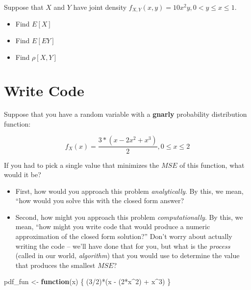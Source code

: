 \documentclass[
]{book}
\newenvironment{Shaded}{\begin{snugshade}}{\end{snugshade}}
\newcommand{\ControlFlowTok}[1]{\textcolor[rgb]{0.13,0.29,0.53}{\textbf{#1}}}
\newcommand{\DecValTok}[1]{\textcolor[rgb]{0.00,0.00,0.81}{#1}}
\newcommand{\NormalTok}[1]{#1}
\newcommand{\OtherTok}[1]{\textcolor[rgb]{0.56,0.35,0.01}{#1}}
\newcommand{\SpecialCharTok}[1]{\textcolor[rgb]{0.00,0.00,0.00}{#1}}
\providecommand{\tightlist}{%
  \setlength{\itemsep}{0pt}\setlength{\parskip}{0pt}}
\theoremstyle{definition}
\theoremstyle{definition}
\theoremstyle{definition}
\theoremstyle{definition}
\theoremstyle{remark}
\begin{document}
\hypertarget{section}{%
\subsubsection{}\label{section}}

Suppose that \(X\) and \(Y\) have joint density \(f_{X,Y}(x,y) = 10 x^2y, 0 < y \leq x \leq 1.\)

\begin{itemize}
\tightlist
\item
  Find \(E[X]\)
\item
  Find \(E[EY]\)
\item
  Find \(\rho[X,Y]\)
\end{itemize}

\hypertarget{write-code}{%
\section{Write Code}\label{write-code}}

Suppose that you have a random variable with a \textbf{gnarly} probability distribution function:

\[ 
  f_{X}(x) = \frac{3*\left(x - 2x^2 + x^3\right)}{2}, 0\leq x\leq 2
\]

If you had to pick a single value that minimizes the \(MSE\) of this function, what would it be?

\begin{itemize}
\tightlist
\item
  First, how would you approach this problem \emph{analytically}. By this, we mean, ``how would you solve this with the closed form answer?
\item
  Second, how might you approach this problem \emph{computationally}. By this, we mean, ``how might you write code that would produce a numeric approximation of the closed form solution?'' Don't worry about actually writing the code -- we'll have done that for you, but what is the \emph{process} (called in our world, \emph{algorithm}) that you would use to determine the value that produces the smallest \(MSE\)?
\end{itemize}

\begin{Shaded}
\begin{Highlighting}[]
\NormalTok{pdf\_fun }\OtherTok{\textless{}{-}} \ControlFlowTok{function}\NormalTok{(x) \{ }
\NormalTok{  (}\DecValTok{3}\SpecialCharTok{/}\DecValTok{2}\NormalTok{)}\SpecialCharTok{*}\NormalTok{(x }\SpecialCharTok{{-}}\NormalTok{ (}\DecValTok{2}\SpecialCharTok{*}\NormalTok{x}\SpecialCharTok{\^{}}\DecValTok{2}\NormalTok{) }\SpecialCharTok{+}\NormalTok{ x}\SpecialCharTok{\^{}}\DecValTok{3}\NormalTok{)}
\NormalTok{\}}
\end{Highlighting}
\end{Shaded}
\end{document}
